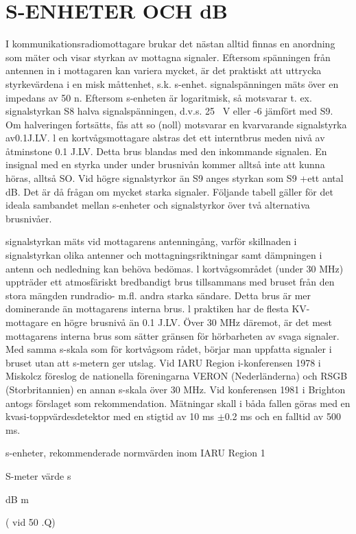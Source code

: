 \chapter{S-ENHETER OCH dB}
\label{s-enhet}

I kommunikationsradiomottagare brukar det
nästan alltid finnas en anordning som mäter
och visar styrkan av mottagna signaler.
Eftersom spänningen från antennen in i
mottagaren kan variera mycket, är det praktiskt att uttrycka styrkevärdena i en
misk måttenhet, s.k. s-enhet.
signalspänningen mäts över en impedans av 50 n.
Eftersom s-enheten är logaritmisk, så
motsvarar t. ex. signalstyrkan S8 halva signalspänningen, d.v.s. 25 ~V eller -6
jämfört
med S9. Om halveringen fortsätts, fås att so
(noll) motsvarar en kvarvarande signalstyrka
av0.1J.LV.
l en kortvågsmottagare alstras det ett
interntbrus meden nivå av åtminstone 0.1 J.LV.
Detta brus blandas med den inkommande
signalen. En insignal med en styrka under
under brusnivån kommer alltså inte att kunna
höras, alltså SO. Vid högre signalstyrkor än
S9 anges styrkan som S9 +ett antal dB. Det
är då frågan om mycket starka signaler.
Följande tabell gäller för det ideala sambandet mellan s-enheter och signalstyrkor
över två alternativa brusnivåer.

signalstyrkan mäts vid mottagarens antenningång, varför skillnaden i signalstyrkan
olika antenner och mottagningsriktningar samt dämpningen i antenn och nedledning kan behöva bedömas.
l kortvågsområdet (under 30 MHz) uppträder ett atmosfäriskt bredbandigt brus tillsammans med bruset från den stora mängden rundradio- m.fl. andra starka sändare.
Detta brus är mer dominerande än mottagarens interna brus. l praktiken har de flesta
KV-mottagare en högre brusnivå än 0.1 J.LV.
Över 30 MHz däremot, är det mest mottagarens interna brus som sätter gränsen för
hörbarheten av svaga signaler. Med samma
s-skala som för kortvågsom rådet, börjar man
uppfatta signaler i bruset utan att s-metern
ger utslag.
Vid IARU Region i-konferensen 1978 i
Miskolcz föreslog de nationella föreningarna
VERON (Nederländerna) och RSGB (Storbritannien) en annan s-skala över 30 MHz.
Vid konferensen 1981 i Brighton antogs förslaget som rekommendation.
Mätningar skall i båda fallen göras med
en kvasi-toppvärdesdetektor med en stigtid
av 10 ms \(\pm\)0.2 ms och en falltid av 500 ms.

s-enheter, rekommenderade normvärden inom IARU Region 1

S-meter
värde
s

dB m

( vid 50 .Q)

